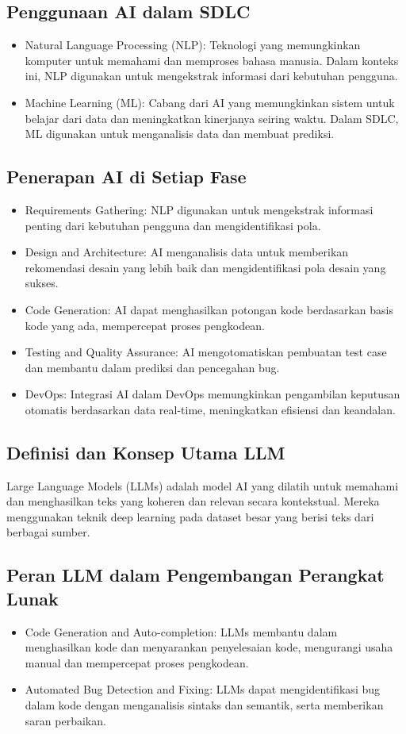 \documentclass{article}
\begin{document}
\subsection{Penggunaan AI dalam SDLC}
\begin{itemize}
    \item Natural Language Processing (NLP): Teknologi yang memungkinkan komputer untuk memahami dan memproses bahasa manusia. Dalam konteks ini, NLP digunakan untuk mengekstrak informasi dari kebutuhan pengguna.
    \item Machine Learning (ML): Cabang dari AI yang memungkinkan sistem untuk belajar dari data dan meningkatkan kinerjanya seiring waktu. Dalam SDLC, ML digunakan untuk menganalisis data dan membuat prediksi.
\end{itemize}

\subsection{Penerapan AI di Setiap Fase}
\begin{itemize}
    \item Requirements Gathering: NLP digunakan untuk mengekstrak informasi penting dari kebutuhan pengguna dan mengidentifikasi pola.
    \item Design and Architecture: AI menganalisis data untuk memberikan rekomendasi desain yang lebih baik dan mengidentifikasi pola desain yang sukses.
    \item Code Generation: AI dapat menghasilkan potongan kode berdasarkan basis kode yang ada, mempercepat proses pengkodean.
    \item Testing and Quality Assurance: AI mengotomatiskan pembuatan test case dan membantu dalam prediksi dan pencegahan bug.
    \item DevOps: Integrasi AI dalam DevOps memungkinkan pengambilan keputusan otomatis berdasarkan data real-time, meningkatkan efisiensi dan keandalan.
\end{itemize}

\subsection{Definisi dan Konsep Utama LLM}
Large Language Models (LLMs) adalah model AI yang dilatih untuk memahami dan menghasilkan teks yang koheren dan relevan secara kontekstual. Mereka menggunakan teknik deep learning pada dataset besar yang berisi teks dari berbagai sumber.

\subsection{Peran LLM dalam Pengembangan Perangkat Lunak}
\begin{itemize}
    \item Code Generation and Auto-completion: LLMs membantu dalam menghasilkan kode dan menyarankan penyelesaian kode, mengurangi usaha manual dan mempercepat proses pengkodean.
    \item Automated Bug Detection and Fixing: LLMs dapat mengidentifikasi bug dalam kode dengan menganalisis sintaks dan semantik, serta memberikan saran perbaikan.
\end{itemize}
\end{document}
